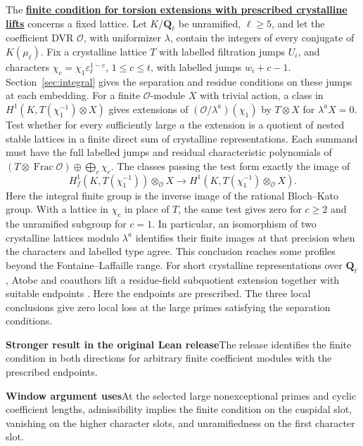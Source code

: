 \documentclass[11pt,a4paper]{article}
\newcommand{\rhscopelabel}[2]{%
  {\setlength{\fboxsep}{2pt}\colorbox{#1}{%
    \small\sffamily\bfseries\color{PageInk}#2}}}
\newcommand{\rhrange}[3][Stronger result in the original Lean release]{%
  \par\addvspace{.45\baselineskip}\Needspace{4\baselineskip}%
  \begingroup\setlength{\leftskip}{.65em}\setlength{\parindent}{0pt}%
  \noindent\rhscopelabel{TraceTint}{#1}\enspace#2\par
  \nobreak\smallskip
  \noindent\rhscopelabel{FieldTint}{Window argument uses}\enspace#3\par
  \endgroup\addvspace{.45\baselineskip}}
\begin{document}
The \textbf{\hyperlink{candidate.residual-crystalline-admissibility}{finite
condition for torsion extensions with prescribed crystalline lifts}}
concerns a fixed lattice. Let \(K/\mathbf Q_\ell\) be unramified,
\(\ell\ge5\), and let the coefficient DVR \(\mathcal O\), with
uniformizer \(\lambda\), contain the integers of every conjugate
of \(K(\mu_\ell)\). Fix a crystalline lattice \(T\) with labelled
filtration jumps \(U_i\), and characters
\(\chi_c=\chi_1\varepsilon_\ell^{1-c}\), \(1\le c\le t\), with
labelled jumps \(w_i+c-1\). Section~\ref{sec:integral} gives
the separation and residue conditions on these jumps at each embedding.
For a finite \(\mathcal O\)-module \(X\) with trivial action, a class
in \(H^1(K,T(\chi_1^{-1})\otimes X)\) gives extensions of
\((\mathcal O/\lambda^a)(\chi_1)\) by \(T\otimes X\) for
\(\lambda^a X=0\). Test whether for every sufficiently large \(a\)
the extension is a quotient of nested stable lattices in a finite
direct sum of crystalline representations. Each summand must have
the full labelled jumps and residual characteristic polynomials of
\((T\otimes\operatorname{Frac}\mathcal O)\oplus\bigoplus_c\chi_c\).
The classes passing the test form exactly the image of
\[
 H_f^1(K,T(\chi_1^{-1}))\otimes_{\mathcal O}X
       \longrightarrow H^1(K,T(\chi_1^{-1})\otimes_{\mathcal O}X).
\]
Here the integral finite group is the inverse image of the rational
Bloch--Kato group. With a lattice in \(\chi_c\) in place of \(T\),
the same test gives zero for \(c\ge2\) and the unramified subgroup
for \(c=1\). In particular, an isomorphism of two crystalline lattices
modulo \(\lambda^a\) identifies their finite images at that precision
when the characters and labelled type agree. This conclusion reaches
some profiles beyond the Fontaine--Laffaille range. For short
crystalline representations over \(\mathbf Q_\ell\), Atobe and
coauthors lift a residue-field subquotient extension together with
suitable endpoints \cite[Lemma~7.6]{atobe-harder-crystalline}.
Here the endpoints are prescribed. The three local conclusions give
zero local loss at the large primes satisfying the separation conditions.
\rhrange{The release identifies the finite condition in both directions
for arbitrary finite coefficient modules with the prescribed endpoints.}
{At the selected large nonexceptional primes and cyclic coefficient
lengths, admissibility implies the finite condition on the cuspidal
slot, vanishing on the higher character slots, and unramifiedness on
the first character slot.}
\end{document}
